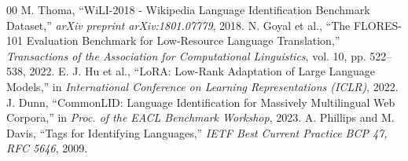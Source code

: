 \documentclass[conference]{IEEEtran}
\begin{document}
\begin{thebibliography}{00}
 M. Thoma, ``WiLI-2018 - Wikipedia Language Identification Benchmark Dataset,'' \textit{arXiv preprint arXiv:1801.07779}, 2018.
 N. Goyal et al., ``The FLORES-101 Evaluation Benchmark for Low-Resource Language Translation,'' \textit{Transactions of the Association for Computational Linguistics}, vol. 10, pp. 522--538, 2022.
 E. J. Hu et al., ``LoRA: Low-Rank Adaptation of Large Language Models,'' in \textit{International Conference on Learning Representations (ICLR)}, 2022.
 J. Dunn, ``CommonLID: Language Identification for Massively Multilingual Web Corpora,'' in \textit{Proc. of the EACL Benchmark Workshop}, 2023.
 A. Phillips and M. Davis, ``Tags for Identifying Languages,'' \textit{IETF Best Current Practice BCP 47, RFC 5646}, 2009.
\end{thebibliography}
\end{document}
